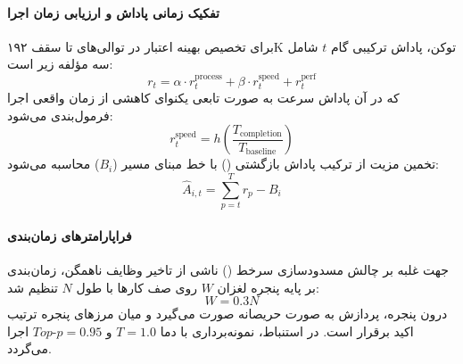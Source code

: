 \paragraph*{تفکیک زمانی پاداش و ارزیابی زمان اجرا}
برای تخصیص بهینه اعتبار در توالی‌های تا سقف ۱۹۲K توکن، پاداش ترکیبی گام $t$ شامل سه مؤلفه زیر است:
\begin{equation}
    r_t = \alpha \cdot r_t^{\text{process}} + \beta \cdot r_t^{\text{speed}} + r_t^{\text{perf}}
\end{equation}
که در آن پاداش سرعت به صورت تابعی یکنوای کاهشی از زمان واقعی اجرا فرمول‌بندی می‌شود:
\begin{equation}
    r_t^{\text{speed}} = h\left(\frac{T_{\text{completion}}}{T_{\text{baseline}}}\right)
\end{equation}
تخمین مزیت از ترکیب پاداش بازگشتی () با خط مبنای مسیر ($B_i$) محاسبه می‌شود:
\begin{equation}
    \hat{A}_{i,t} = \sum_{p=t}^T r_p - B_i
\end{equation}

\paragraph*{فراپارامترهای زمان‌بندی }
جهت غلبه بر چالش مسدودسازی سرخط () ناشی از تاخیر وظایف ناهمگن، زمان‌بندی بر پایه پنجره لغزان $W$ روی صف کارها با طول $N$ تنظیم شد:
\begin{equation}
    W = 0.3 N
\end{equation}
درون پنجره، پردازش به صورت حریصانه صورت می‌گیرد و میان مرزهای پنجره ترتیب اکید  برقرار است. در استنباط، نمونه‌برداری با دما $T=1.0$ و $Top\text{-}p=0.95$ اجرا می‌گردد.

